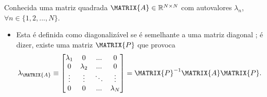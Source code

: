 \begin{definition}\label{def:diagonalization0}
Conhecida uma matriz quadrada $\MATRIX{A} \in \mathbb{R}^{N \times N}$ com
autovalores $\lambda_n$, $\forall n \in \{1, 2, ..., N\}$.
\begin{itemize}
\item Esta é definida como diagonalizável se é semelhante a uma matriz diagonal \cite[pp. 67]{golub2013matrix};
é dizer, existe uma matriz $\MATRIX{P}$ que provoca
\begin{equation}
\lambda_\MATRIX{A}\equiv
\begin{bmatrix}
\lambda_1 & 0         & ...    & 0 \\
0         & \lambda_2 & ...    & 0 \\
\vdots    & \vdots    & \ddots & \vdots \\
0         & 0         & ...    & \lambda_N
\end{bmatrix}
=\MATRIX{P}^{-1}\MATRIX{A}\MATRIX{P}.
\end{equation}
\end{itemize}
\end{definition}

~

